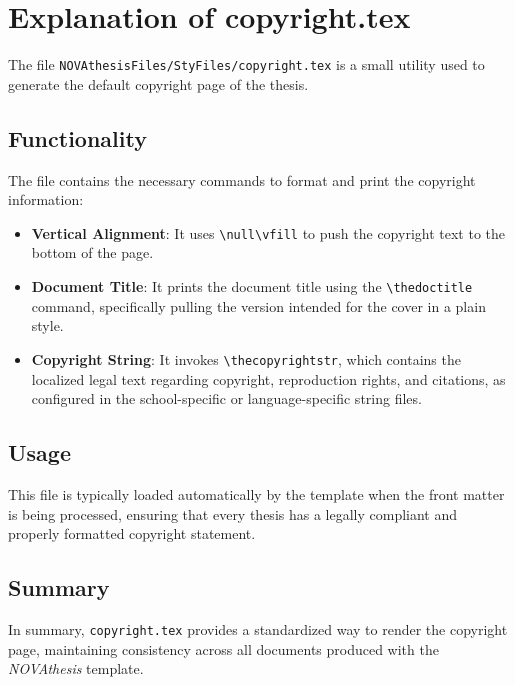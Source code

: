 

\chapter{Explanation of copyright.tex}
\label{annex:copyright}

The file \texttt{NOVAthesisFiles/StyFiles/copyright.tex} is a small utility used to generate the default copyright page of the thesis.

\section{Functionality}
The file contains the necessary commands to format and print the copyright information:
\begin{itemize}
    \item \textbf{Vertical Alignment}: It uses \texttt{\textbackslash null\textbackslash vfill} to push the copyright text to the bottom of the page.
    \item \textbf{Document Title}: It prints the document title using the \texttt{\textbackslash thedoctitle} command, specifically pulling the version intended for the cover in a plain style.
    \item \textbf{Copyright String}: It invokes \texttt{\textbackslash thecopyrightstr}, which contains the localized legal text regarding copyright, reproduction rights, and citations, as configured in the school-specific or language-specific string files.
\end{itemize}

\section{Usage}
This file is typically loaded automatically by the template when the front matter is being processed, ensuring that every thesis has a legally compliant and properly formatted copyright statement.

\section{Summary}
In summary, \texttt{copyright.tex} provides a standardized way to render the copyright page, maintaining consistency across all documents produced with the \emph{NOVAthesis} template.
